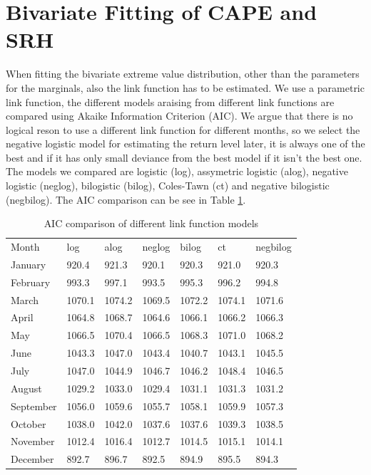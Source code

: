 \documentclass[10pt,conference,compsocconf]{IEEEtran}
\begin{document}
\section*{Bivariate Fitting of CAPE and SRH}
When fitting the bivariate extreme value distribution, other than the parameters for the marginals, also the link function has to be estimated. We use a parametric link function, the different models araising from different link functions are compared using Akaike Information Criterion (AIC). We argue that there is no logical reson to use a different link function for different months, so we select the negative logistic model for estimating the return level later, it is always one of the best and if it has only small deviance from the best model if it isn't the best one. The models we compared are logistic (log), assymetric logistic (alog), negative logistic (neglog), bilogistic (bilog), Coles-Tawn (ct) and negative bilogistic (negbilog). The AIC comparison can be see in Table \ref{table:cape_srh_AIC}.
\begin{table}[]
\begin{tabular}{lllllll}
Month     & log       & alog      & neglog    & bilog     & ct        & negbilog  \\
January   & 920.4  & 921.3  & 920.1  & 920.3  & 921.0  & 920.3  \\
February  & 993.3  & 997.1  & 993.5  & 995.3  & 996.2  & 994.8  \\
March     & 1070.1 & 1074.2 & 1069.5 & 1072.2 & 1074.1 & 1071.6 \\
April     & 1064.8 & 1068.7 & 1064.6 & 1066.1 & 1066.2 & 1066.3 \\
May       & 1066.5 & 1070.4 & 1066.5 & 1068.3 & 1071.0 & 1068.2 \\
June      & 1043.3 & 1047.0 & 1043.4 & 1040.7 & 1043.1 & 1045.5 \\
July      & 1047.0 & 1044.9 & 1046.7 & 1046.2 & 1048.4 & 1046.5 \\
August    & 1029.2 & 1033.0 & 1029.4 & 1031.1 & 1031.3 & 1031.2 \\
September & 1056.0 & 1059.6 & 1055.7 & 1058.1 & 1059.9 & 1057.3 \\
October   & 1038.0 & 1042.0 & 1037.6 & 1037.6 & 1039.3 & 1038.5 \\
November  & 1012.4 & 1016.4 & 1012.7 & 1014.5 & 1015.1 & 1014.1 \\
December  & 892.7  & 896.7  & 892.5  & 894.9  & 895.5  & 894.3
\end{tabular}
\caption{AIC comparison of different link function models}
\label{table:cape_srh_AIC}
\end{table}
\end{document}

